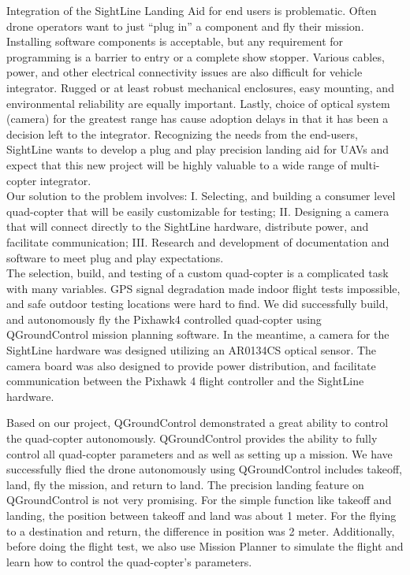 \documentclass[11pt]{article}
\begin{document}
 Integration of the SightLine Landing Aid for end users is problematic.  Often drone operators want to just “plug in” a component and fly their mission.  Installing software components is acceptable, but any requirement for programming is a barrier to entry or a complete show stopper.  Various cables, power, and other electrical connectivity issues are also difficult for vehicle integrator.  Rugged or at least robust mechanical enclosures, easy mounting, and environmental reliability are equally important.  Lastly, choice of optical system (camera) for the greatest range has cause adoption delays in that it has been a decision left to the integrator. Recognizing the needs from the end-users, SightLine wants to develop a plug and play precision landing aid for UAVs and expect that this new project will be highly valuable to a wide range of multi-copter integrator.
\\
 Our solution to the problem involves: I. Selecting, and building a consumer level quad-copter that will  be easily customizable for testing; II. Designing a camera that will connect directly to the SightLine hardware, distribute power, and facilitate communication; III. Research and development of documentation and software to meet plug and play expectations.
\\
 The selection, build, and testing of a custom quad-copter is a complicated task with many variables. GPS signal degradation made indoor flight tests impossible, and safe outdoor testing locations were hard to find. We did successfully build, and autonomously fly the Pixhawk4 controlled quad-copter using QGroundControl mission planning software. In the meantime, a camera for the SightLine hardware was designed utilizing an AR0134CS optical sensor. The camera board was also designed to provide power distribution, and facilitate communication between the Pixhawk 4 flight controller and the SightLine hardware.


Based on our project, QGroundControl demonstrated a great ability to control the quad-copter autonomously. QGroundControl provides the ability to fully control all quad-copter parameters and as well as setting up a mission. We have successfully flied the drone autonomously using QGroundControl includes takeoff, land, fly the mission, and return to land. The precision landing feature on QGroundControl is not very promising. For the simple function like takeoff and landing, the position between takeoff and land was about 1 meter. For the flying to a destination and return, the difference in position was 2 meter. Additionally, before doing the flight test, we also use Mission Planner to simulate the flight and learn how to control the quad-copter's parameters.
   
\end{document}
